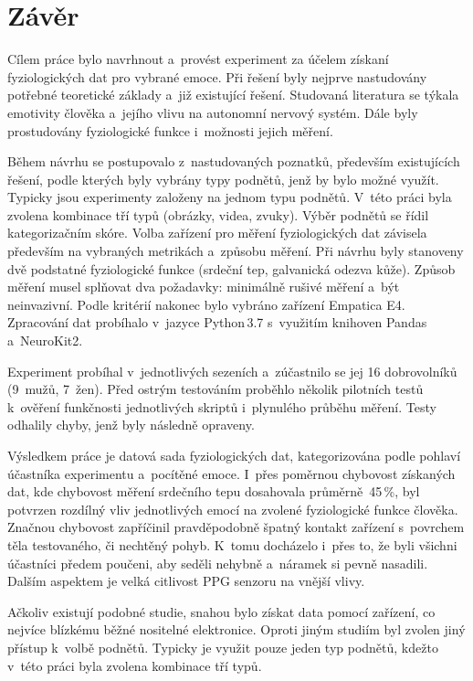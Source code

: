 \pagebreak
    \chapter{Závěr}
    \label{zaver}
    Cílem práce bylo navrhnout a~provést experiment za účelem získaní fyziologických dat pro vybrané emoce. Při řešení byly nejprve nastudovány potřebné teoretické základy a~již existující řešení. Studovaná literatura se týkala emotivity člověka a~jejího vlivu na autonomní nervový systém. Dále byly prostudovány fyziologické funkce i~možnosti jejich měření.
    
    Během návrhu se postupovalo z~nastudovaných poznatků, především existujících řešení, podle kterých byly vybrány typy podnětů, jenž by bylo možné využít. Typicky jsou experimenty založeny na jednom typu podnětů. V~této práci byla zvolena kombinace tří typů (obrázky, videa, zvuky). Výběr podnětů se řídil kategorizačním skóre. Volba zařízení pro měření fyziologických dat závisela především na vybraných metrikách a~způsobu měření. Při návrhu byly stanoveny dvě podstatné fyziologické funkce (srdeční tep, galvanická odezva kůže). Způsob měření musel splňovat dva požadavky: minimálně rušivé měření a~být neinvazivní. Podle kritérií nakonec bylo vybráno zařízení Empatica E4. Zpracování dat probíhalo v~jazyce Python\,3.7 s~využitím knihoven Pandas a~NeuroKit2.
    
    Experiment probíhal v~jednotlivých sezeních a~zúčastnilo se jej 16 dobrovolníků (9~mužů, 7~žen). Před ostrým testováním proběhlo několik pilotních testů k~ověření funkčnosti jednotlivých skriptů i~plynulého průběhu měření. Testy odhalily chyby, jenž byly následně opraveny. 
    
    Výsledkem práce je datová sada fyziologických dat, kategorizována podle pohlaví účastníka experimentu a~pocítěné emoce. I~přes poměrnou chybovost získaných dat, kde chybovost měření srdečního tepu dosahovala průměrně~45\,\%, byl potvrzen rozdílný vliv jednotlivých emocí na zvolené fyziologické funkce člověka. Značnou chybovost zapříčinil pravděpodobně špatný kontakt zařízení s~povrchem těla testovaného, či nechtěný pohyb. K~tomu docházelo i~přes to, že byli všichni účastníci předem poučeni, aby seděli nehybně a~náramek si pevně nasadili. Dalším aspektem je velká citlivost PPG senzoru na vnější vlivy.
    
    Ačkoliv existují podobné studie, snahou bylo získat data pomocí zařízení, co nejvíce blízkému běžné nositelné elektronice. Oproti jiným studiím byl zvolen jiný přístup k~volbě podnětů. Typicky je využit pouze jeden typ podnětů, kdežto v~této práci byla zvolena kombinace tří typů.